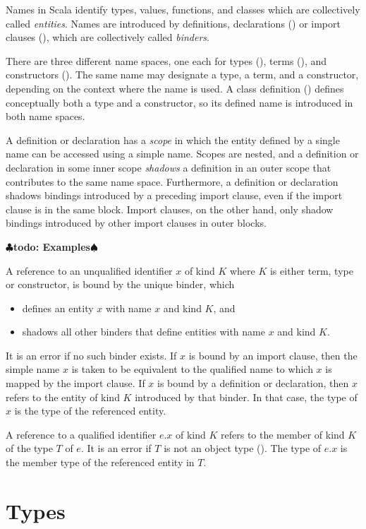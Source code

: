 \documentclass[11pt]{report}
\renewcommand{\todo}[1]{{$\clubsuit$\bf todo: #1$\spadesuit$}}
\begin{document}
Names in Scala identify types, values, functions, and classes which
are collectively called {\em entities}.  Names are introduced by
definitions, declarations () or import clauses
(), which are collectively called {\em binders}.

There are three different name spaces, one each for types
(), terms (), and constructors
().  The same name may designate a type, a term, and
a constructor, depending on the context where the name is used.  A
class definition () defines conceptually both a type
and a constructor, so its defined name is introduced in both name
spaces.

A definition or declaration has a {\em scope} in which the entity
defined by a single name can be accessed using a simple name. Scopes
are nested, and a definition or declaration in some inner scope {\em
shadows} a definition in an outer scope that contributes to the same
name space. Furthermore, a definition or declaration shadows bindings
introduced by a preceding import clause, even if the import clause is
in the same block. Import clauses, on the other hand, only shadow
bindings introduced by other import clauses in outer blocks.

\todo{Examples}

A reference to an unqualified identifier $x$ of kind $K$ where $K$ is
either term, type or constructor, is bound by the unique binder, which
\begin{itemize}
\item defines an entity $x$ with name $x$ and kind $K$, and
\item shadows all other binders that define entities with name $x$
and kind $K$.
\end{itemize}
It is an error if no such binder exists.  If $x$ is bound by an import
clause, then the simple name $x$ is taken to be equivalent to the
qualified name to which $x$ is mapped by the import clause. If $x$ is bound by a definition or declaration,
then $x$ refers to the entity of kind $K$ introduced by that
binder. In that case, the type of $x$ is the type of the referenced
entity.

A reference to a qualified identifier $e.x$ of kind $K$ refers to the
member of kind $K$ of the type $T$ of $e$. It is an error if $T$ is
not an object type (). The type of $e.x$ is the
member type of the referenced entity in $T$.

\chapter{\label{sec:types}Types}
\end{document}
